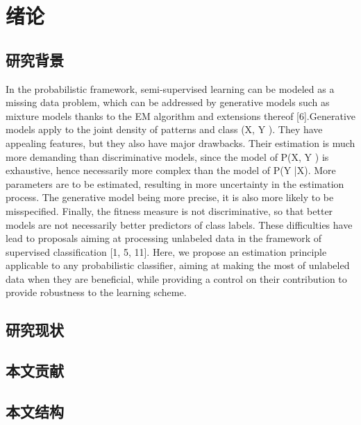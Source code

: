 \chapter{绪论}\label{chap:introduction}

\section{研究背景}
In the probabilistic framework, semi-supervised learning can be modeled as a missing data
problem, which can be addressed by generative models such as mixture models thanks
to the EM algorithm and extensions thereof [6].Generative models apply to the joint density of patterns and class (X, Y ). They have appealing features, but they also have major
drawbacks. Their estimation is much more demanding than discriminative models, since
the model of P(X, Y ) is exhaustive, hence necessarily more complex than the model of
P(Y |X). More parameters are to be estimated, resulting in more uncertainty in the estimation process. The generative model being more precise, it is also more likely to be
misspecified. Finally, the fitness measure is not discriminative, so that better models are
not necessarily better predictors of class labels. These difficulties have lead to proposals
aiming at processing unlabeled data in the framework of supervised classification [1, 5, 11].
Here, we propose an estimation principle applicable to any probabilistic classifier, aiming
at making the most of unlabeled data when they are beneficial, while providing a control
on their contribution to provide robustness to the learning scheme.
\section{研究现状}
\section{本文贡献}
\section{本文结构}